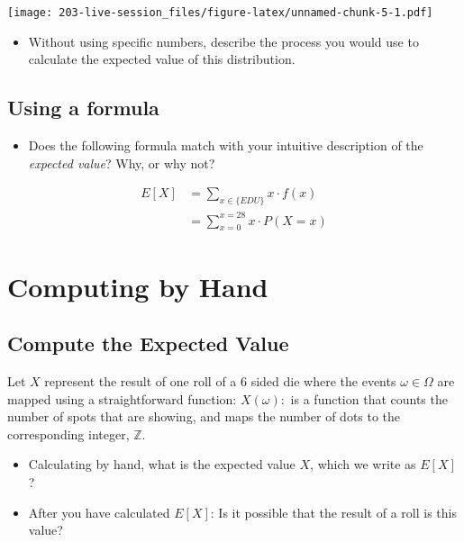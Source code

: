 \documentclass[
]{book}
\providecommand{\tightlist}{%
  \setlength{\itemsep}{0pt}\setlength{\parskip}{0pt}}
\theoremstyle{definition}
\theoremstyle{definition}
\theoremstyle{definition}
\theoremstyle{definition}
\theoremstyle{remark}
\begin{document}
\texttt{[image: 203-live-session\_files/figure-latex/unnamed-chunk-5-1.pdf]}

\begin{itemize}
\tightlist
\item
  Without using specific numbers, describe the process you would use to calculate the expected value of this distribution.
\end{itemize}

\hypertarget{using-a-formula}{%
\subsection{Using a formula}\label{using-a-formula}}

\begin{itemize}
\tightlist
\item
  Does the following formula match with your intuitive description of the \emph{expected value}? Why, or why not?
\end{itemize}

\[
  \begin{aligned}
  E[X] &= \sum_{x \in \{EDU\}} x \cdot f(x) \\ 
       &= \sum_{x=0}^{x=28} x\cdot P(X=x)
  \end{aligned}
\]

\hypertarget{computing-by-hand}{%
\section{Computing by Hand}\label{computing-by-hand}}

\hypertarget{compute-the-expected-value}{%
\subsection{Compute the Expected Value}\label{compute-the-expected-value}}

Let \(X\) represent the result of one roll of a 6 sided die where the events \(\omega \in \Omega\) are mapped using a straightforward function: \(X(\omega):\) is a function that counts the number of spots that are showing, and maps the number of dots to the corresponding integer, \(\mathbb{Z}\).

\begin{itemize}
\tightlist
\item
  Calculating by hand, what is the expected value \(X\), which we write as \(E[X]\)?
\item
  After you have calculated \(E[X]\): Is it possible that the result of a roll is this value?
\end{itemize}
\end{document}
